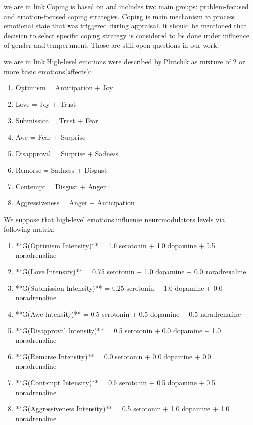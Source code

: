 we are in link
Coping is based on \cite{dont_worry_be_happy} and includes two main groups: problem-focused and emotion-focused coping strategies. Coping is main mechanism to process emotional state that was triggered during appraisal. It should be mentioned that decision to select specific coping strategy is considered to be done under influence of gender and temperament. Those are still open questions in our work.

we are in link
High-level emotions were described by Plutchik \cite{natureofemotions} as mixture of 2 or more basic emotions(affects):

\begin{enumerate}
\item  Optimism =	Anticipation + Joy
\item  Love =	Joy + Trust
\item  Submission = Trust + Fear
\item  Awe = Fear + Surprise
\item  Disapproval = Surprise + Sadness
\item  Remorse = Sadness + Disgust
\item  Contempt = Disgust + Anger
\item  Aggressiveness =	Anger + Anticipation
\end{enumerate}

We suppose that high-level emotions influence neuromodulators levels via following matrix:

\begin{enumerate}
\item  **G(Optimism Intensity)** = 1.0 serotonin  + 1.0 dopamine + 0.5 noradrenaline
\item  **G(Love Intensity)** = 0.75 serotonin + 1.0 dopamine + 0.0 noradrenaline
\item  **G(Submission Intensity)** = 0.25 serotonin + 1.0 dopamine + 0.0 noradrenaline
\item  **G(Awe Intensity)** = 0.5 serotonin + 0.5 dopamine + 0.5 noradrenaline
\item  **G(Disapproval Intensity)** = 0.5 serotonin + 0.0 dopamine + 1.0 noradrenaline
\item  **G(Remorse Intensity)** = 0.0 serotonin + 0.0 dopamine + 0.0 noradrenaline
\item  **G(Contempt Intensity)** = 0.5 serotonin + 0.5 dopamine + 0.5 noradrenaline
\item  **G(Aggressiveness Intensity)** = 0.5 serotonin + 1.0 dopamine + 1.0 noradrenaline
\end{enumerate}

